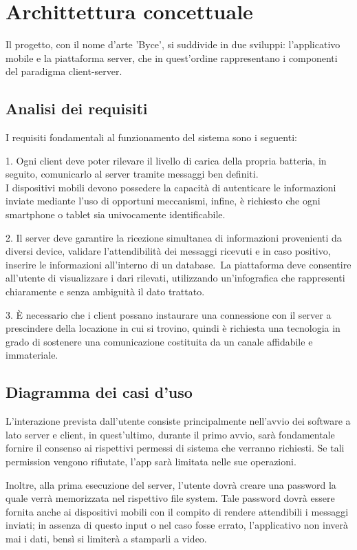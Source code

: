 \documentclass[target=bach]{thud}
\begin{document}
\chapter{Archittettura concettuale}
    Il progetto, con il nome d'arte 'Byce', si suddivide in due sviluppi: l'applicativo mobile e la piattaforma server, che in quest'ordine rappresentano i componenti del paradigma client-server.

\section{Analisi dei requisiti}
    I requisiti fondamentali al funzionamento del sistema sono i seguenti:

    1. Ogni client deve poter rilevare il livello di carica della propria batteria, in seguito, comunicarlo al server tramite messaggi ben definiti.\\
    I dispositivi mobili devono possedere la capacità di autenticare le informazioni inviate mediante l'uso di opportuni meccanismi, infine, è richiesto che ogni smartphone o tablet sia univocamente identificabile.

    2. Il server deve garantire la ricezione simultanea di informazioni provenienti da diversi device, validare l'attendibilità dei messaggi ricevuti e in caso positivo, inserire le informazioni all'interno di un database.\
    La piattaforma deve consentire all'utente di visualizzare i dari rilevati, utilizzando un'infografica che rappresenti chiaramente e senza ambiguità il dato trattato.

    3. \`E necessario che i client possano instaurare una connessione con il server a prescindere della locazione in cui si trovino, quindi è richiesta una tecnologia in grado di sostenere una comunicazione costituita da un canale affidabile e immateriale.

\section{Diagramma dei casi d'uso}

    L'interazione prevista dall'utente consiste principalmente nell'avvio dei software a lato server e client, in quest'ultimo, durante il primo avvio, sarà fondamentale fornire il consenso ai rispettivi permessi di sistema che verranno richiesti. Se tali permission vengono rifiutate, l'app sarà limitata nelle sue operazioni.\

    Inoltre, alla prima esecuzione del server, l'utente dovrà creare una password la quale verrà memorizzata nel rispettivo file system. Tale password dovrà essere fornita anche ai dispositivi mobili con il compito di rendere attendibili i messaggi inviati; in assenza di questo input o nel caso fosse errato, l'applicativo non inverà mai i dati, bensì si limiterà a stamparli a video.\
\end{document}
